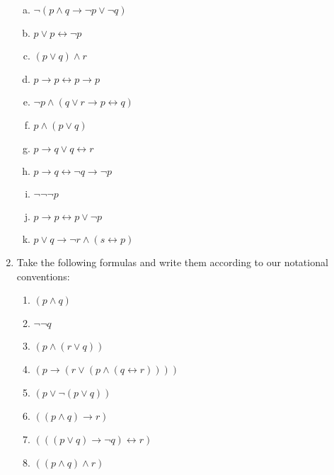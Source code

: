 \begin{enumerate}[\thesection.1]
\begin{enumerate}[(a)]
		\item  $\neg(p\land q\to \neg p\lor\neg q)$
		
		\item  $p\lor p\leftrightarrow \neg p$

		\item  $(p\lor q)\land r$
		
		\item $p\to p\leftrightarrow p\to p$

		\item  $\neg p \land (q\lor r\to p\leftrightarrow q)$
		
		\item $p\land (p\lor q)$ 

		\item $p\to q\lor q\leftrightarrow r$

		\item $p\to q\leftrightarrow \neg q\to \neg p$  

		\item $\neg\neg\neg p$

		\item ${p} \to {p} \leftrightarrow {p}\lor \neg {p}$

		\item $p\lor q\to \neg r\land (s\leftrightarrow {p})$

		\end{enumerate}
		
	\item Take the following formulas and write them according to our notational conventions:
	
		\begin{enumerate}
		
			\item $(p\land q)$
		
			\item $\neg\neg q$
			
			\item $(p\land (r\lor q))$
			
			\item $(p\to (r\lor (p\land (q\leftrightarrow r))))$
			
			\item $(p\lor \neg (p\lor q))$
			
			\item $((p\land q)\to r)$
			
			\item $(((p\lor q)\to \neg q)\leftrightarrow r)$
			
			\item $((p\land q)\land r)$
			

\end{enumerate}
\end{enumerate}
